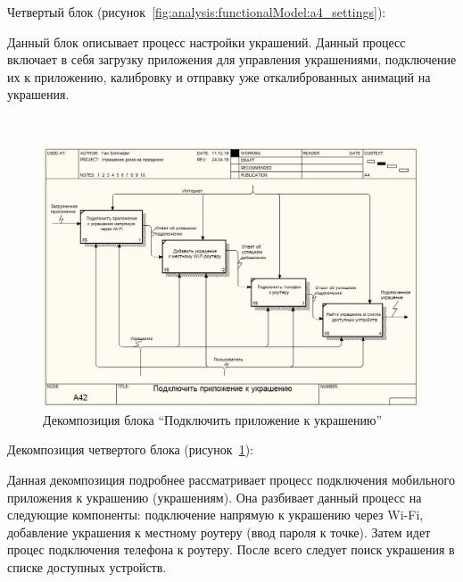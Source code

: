 Четвертый блок (рисунок~\ref{fig:analysis:functionalModel:a4_settings}):

Данный блок описывает процесс настройки украшений. Данный процесс включает в себя загрузку приложения для управления украшениями, подключение их к приложению, калибровку и отправку уже откалиброванных анимаций на украшения. 

~
\begin{figure}[H]
\centering
	\includegraphics[scale=0.45]{figures/functionalModel/a42_connecting.png}
	\caption{Декомпозиция блока \enquote{Подключить приложение к украшению}}
	\label{fig:analysis:functionalModel:a42_connecting}
\end{figure}

Декомпозиция четвертого блока (рисунок~\ref{fig:analysis:functionalModel:a42_connecting}):

Данная декомпозиция подробнее рассматривает процесс подключения мобильного приложения к украшению (украшениям). Она разбивает данный процесс на следующие компоненты: подключение напрямую к украшению через Wi-Fi, добавление украшения к местному роутеру (ввод пароля к точке). Затем идет процес подключения телефона к роутеру. После всего следует поиск украшения в списке доступных устройств.
